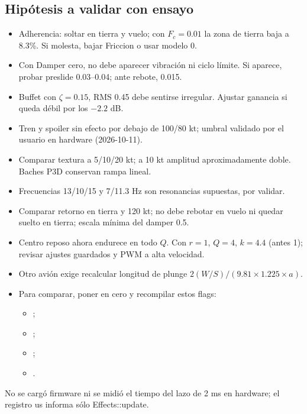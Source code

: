 \subsection{Hipótesis a validar con ensayo}
\begin{itemize}
\item Adherencia: soltar en tierra y vuelo; con $F_c=0.01$ la zona de tierra baja a 8.3\%. Si molesta, bajar Friccion o usar modelo 0.
\item Con Damper cero, no debe aparecer vibración ni ciclo límite. Si aparece, probar preslide 0.03--0.04; ante rebote, 0.015.
\item Buffet con $\zeta=0.15$, RMS 0.45 debe sentirse irregular. Ajustar ganancia si queda débil por los $-2.2$ dB.
\item Tren y spoiler sin efecto por debajo de 100/80 kt; umbral validado por el usuario en hardware (2026-10-11).
\item Comparar textura a 5/10/20 kt; a 10 kt amplitud aproximadamente doble. Baches P3D conservan rampa lineal.
\item Frecuencias 13/10/15 y 7/11.3 Hz son resonancias supuestas, por validar.
\item Comparar retorno en tierra y 120 kt; no debe rebotar en vuelo ni quedar suelto en tierra; escala mínima del damper 0.5.
\item Centro reposo ahora endurece en todo $Q$. Con $r=1$, $Q=4$, $k=4.4$ (antes 1); revisar ajustes guardados y PWM a alta velocidad.
\item Otro avión exige recalcular longitud de plunge $2(W/S)/(9.81\times1.225\times a)$.
\item Para comparar, poner en cero y recompilar estos flags:
\begin{itemize}
\item {};
\item {};
\item {};
\item {}.
\end{itemize}
\end{itemize}
No se cargó firmware ni se midió el tiempo del lazo de 2 ms en hardware; el registro us informa sólo Effects::update.



